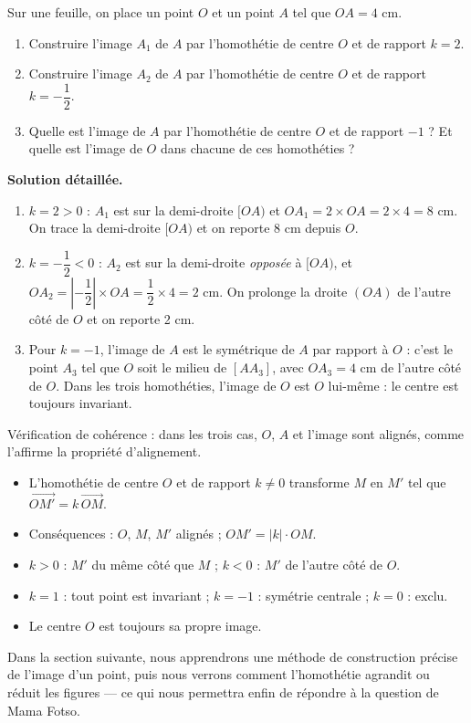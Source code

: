\documentclass[11pt]{article}
\begin{document}
\begin{exoresolu}
Sur une feuille, on place un point $O$ et un point $A$ tel que $OA = 4$ cm.
\begin{enumerate}
\item Construire l'image $A_1$ de $A$ par l'homothétie de centre $O$ et de rapport $k = 2$.
\item Construire l'image $A_2$ de $A$ par l'homothétie de centre $O$ et de rapport $k = -\dfrac{1}{2}$.
\item Quelle est l'image de $A$ par l'homothétie de centre $O$ et de rapport $-1$ ? Et quelle est l'image de $O$ dans chacune de ces homothéties ?
\end{enumerate}
\tcblower
\textbf{Solution détaillée.}
\begin{enumerate}
\item $k = 2 > 0$ : $A_1$ est sur la demi-droite $[OA)$ et $OA_1 = 2 \times OA = 2 \times 4 = 8$ cm. On trace la demi-droite $[OA)$ et on reporte 8 cm depuis $O$.
\item $k = -\dfrac{1}{2} < 0$ : $A_2$ est sur la demi-droite \emph{opposée} à $[OA)$, et $OA_2 = \left|-\dfrac{1}{2}\right| \times OA = \dfrac{1}{2} \times 4 = 2$ cm. On prolonge la droite $(OA)$ de l'autre côté de $O$ et on reporte 2 cm.
\item Pour $k = -1$, l'image de $A$ est le symétrique de $A$ par rapport à $O$ : c'est le point $A_3$ tel que $O$ soit le milieu de $[AA_3]$, avec $OA_3 = 4$ cm de l'autre côté de $O$. Dans les trois homothéties, l'image de $O$ est $O$ lui-même : le centre est toujours invariant.
\end{enumerate}
Vérification de cohérence : dans les trois cas, $O$, $A$ et l'image sont alignés, comme l'affirme la propriété d'alignement.
\end{exoresolu}

\begin{aretenir}
\begin{itemize}
\item L'homothétie de centre $O$ et de rapport $k \neq 0$ transforme $M$ en $M'$ tel que $\overrightarrow{OM'} = k\,\overrightarrow{OM}$.
\item Conséquences : $O$, $M$, $M'$ alignés ; $OM' = |k| \cdot OM$.
\item $k > 0$ : $M'$ du même côté que $M$ ; $k < 0$ : $M'$ de l'autre côté de $O$.
\item $k = 1$ : tout point est invariant ; $k = -1$ : symétrie centrale ; $k = 0$ : exclu.
\item Le centre $O$ est toujours sa propre image.
\end{itemize}
Dans la section suivante, nous apprendrons une méthode de construction précise de l'image d'un point, puis nous verrons comment l'homothétie agrandit ou réduit les figures — ce qui nous permettra enfin de répondre à la question de Mama Fotso.
\end{aretenir}
\end{document}
